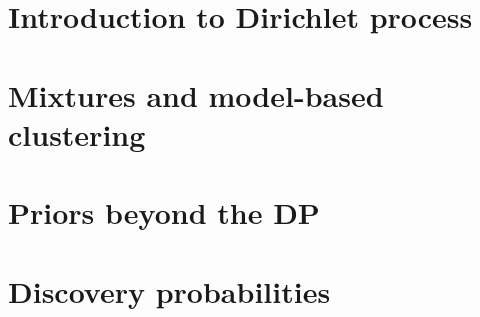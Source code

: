 

\section{Introduction to Dirichlet process}





\section{Mixtures and model-based clustering}





\section{Priors beyond the DP}





\section{Discovery probabilities}